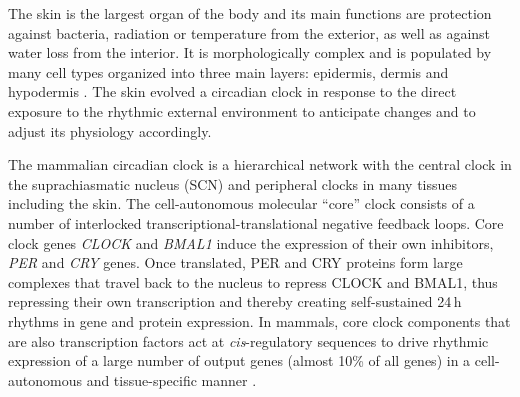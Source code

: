 The skin is the largest organ of the body and its main functions are protection against bacteria, radiation or temperature from the exterior, as well as against water loss from the interior\cite{Wong2016}. It is morphologically complex and is populated by many cell types organized into three main layers: epidermis, dermis and hypodermis \cite{Plikus2015}. The skin evolved a circadian clock \cite{Allada2021} in response to the direct exposure to the rhythmic external environment to anticipate changes and to adjust its physiology accordingly. 

\newpage

The mammalian circadian clock is a hierarchical network with the central clock in the suprachiasmatic nucleus (SCN) and peripheral clocks in many tissues including the skin. The cell-autonomous molecular ``core'' clock \cite{Takahashi2017, Dibner2010} consists of a number of interlocked transcriptional-translational negative feedback loops. Core clock genes \textit{CLOCK} and \textit{BMAL1} induce the expression of their own inhibitors, \textit{PER} and \textit{CRY} genes. Once translated, PER and CRY proteins form large complexes that travel back to the nucleus to repress CLOCK and BMAL1, thus repressing their own transcription and thereby creating self-sustained 24\,h rhythms in gene and protein expression. In mammals, core clock components that are also transcription factors act at \textit{cis}-regulatory sequences to drive rhythmic expression of a large number of output genes (almost 10\% of all genes) in a cell-autonomous and tissue-specific manner \cite{Zhang2014, Ruben2018}.

